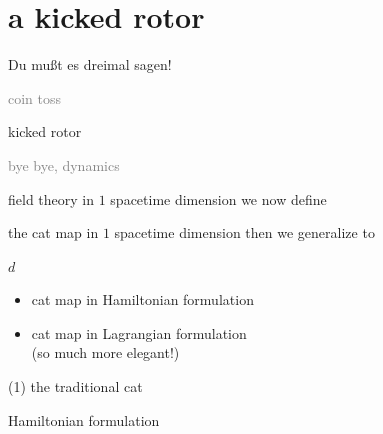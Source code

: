 \section[a kicked rotor]
 {a kicked rotor}

\begin{frame}{}
\begin{bartlett}{
Du mu{\ss}t es dreimal sagen!
        }
\end{bartlett}
\vfill
\begin{enumerate}
              \item \textcolor{gray}{\small
coin toss
                  }
              \item {\Large
kicked rotor
                  }\textcolor{gray}{\small
              \item
\catlatt
              \item
bye bye, dynamics
                    }
            \end{enumerate}
\end{frame}


\begin{frame}{field theory in $1$ spacetime dimension}
we now define

\bigskip

\begin{block}{the cat map in $1$ spacetime dimension}
then we generalize to

\bigskip

$d$\dmn\ {\Large \catlatt}
\end{block}

\vfill

\begin{itemize}
  \item cat map in Hamiltonian formulation
  \item cat map in Lagrangian formulation\\
    {\footnotesize (so much more elegant!)}
\end{itemize}
\end{frame}

\begin{frame}{(1) the traditional cat}
\vfill

\begin{center}
{\huge Hamiltonian formulation}
\end{center}

\vfill
\end{frame}

